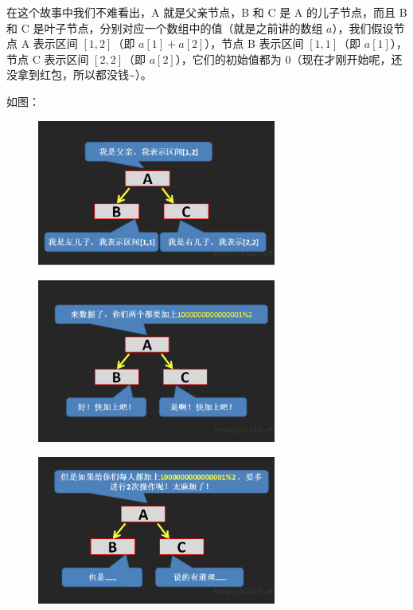 在这个故事中我们不难看出，A 就是父亲节点，B 和 C 是 A 的儿子节点，而且 B 和 C 是叶子节点，分别对应一个数组中的值（就是之前讲的数组 $a$），我们假设节点 A 表示区间 $[1,2]$（即 $a[1]+a[2]$），节点 B 表示区间 $[1,1]$（即 $a[1]$），节点 C 表示区间 $[2,2]$（即 $a[2]$），它们的初始值都为 $0$（现在才刚开始呢，还没拿到红包，所以都没钱\textasciitilde{}）。

如图：

\begin{figure}[htbp]
\centering
\includegraphics[width=0.7\textwidth]{docs/ds/images/segt8.png} 

\end{figure}

\begin{figure}[htbp]
\centering
\includegraphics[width=0.7\textwidth]{docs/ds/images/segt9.png} 

\end{figure}

\begin{figure}[htbp]
\centering
\includegraphics[width=0.7\textwidth]{docs/ds/images/segt10.png} 

\end{figure}

